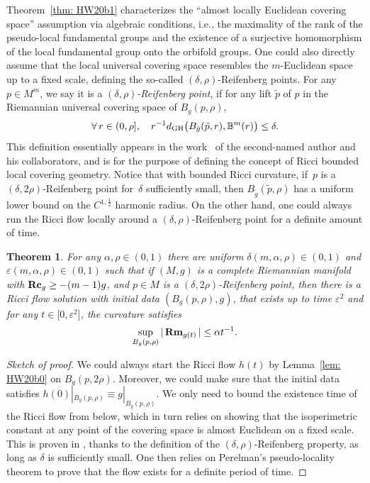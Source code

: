\documentclass[pdftex]{sigma}
\numberwithin{equation}{section}
\newtheorem{Theorem}{Theorem}[section]
\newcommand{\Rm}{\operatorname{\bf Rm}}
\newcommand{\Rc}{\operatorname{\bf Rc}}
\begin{document}
Theorem~\ref{thm: HW20b1} characterizes the ``almost locally Euclidean
covering space'' assumption via algebraic conditions, i.e., the maximality of
the rank of the pseudo-local fundamental groups and the existence of a
surjective homomorphism of the local fundamental group onto the orbifold
groups. One could also directly assume that the local universal covering space
resembles the $m$-Euclidean space up to a fixed scale, defining the so-called
$(\delta,\rho)$-Reifenberg points. For any $p\in M^m$, we say it is a
$(\delta,\rho)$\emph{-Reifenberg point}, if for any lift $\tilde{p}$ of $p$ in
the Riemannian universal covering space of $B_g(p,\rho)$,
\begin{align*}
\forall\, r\in (0,\rho],\quad r^{-1}d_{\rm GH} \big(B_{\tilde{g}}(\tilde{p},r),
\mathbb{B}^m(r) \big) \le \delta.
\end{align*}
This definition essentially appears in the work~\cite{HKRX18} of the
second-named author and his collaborators, and is for the purpose of defining
the concept of Ricci bounded local covering geometry. Notice that with bounded
Ricci curvature, if~$p$ is a~$(\delta,2\rho)$-Reifenberg point for~$\delta$
sufficiently small, then $B_{\tilde{g}}(\tilde{p},\rho)$ has a uniform lower
bound on the $C^{1,\frac{1}{2}}$ harmonic radius. On the other hand, one could
always run the Ricci flow locally around a $(\delta,\rho)$-Reifenberg point for
a definite amount of time.
\begin{Theorem}\label{thm: HKRX18b}
For any $\alpha,\rho \in (0,1)$ there are uniform $\delta(m,\alpha,\rho) \in
(0,1)$ and $\varepsilon(m,\alpha,\rho)\in (0,1)$ such that if $(M,g)$ is a
complete Riemannian manifold with $\Rc_g\ge-(m-1)g$, and $p\in M$ is a
$(\delta,2\rho)$-Reifenberg point, then there is a Ricci flow solution with
initial data $(B_g(p,\rho),g)$, that exists up to time $\varepsilon^2$
and for any $t\in \big[0,\varepsilon^2\big]$, the curvature satisfies
\begin{align*}
\sup_{B_g(p,\rho)} |\Rm_{g(t)} | \le \alpha t^{-1}.
\end{align*}
\end{Theorem}
\begin{proof}[Sketch of proof]
We could always start the Ricci flow $h(t)$ by Lemma~\ref{lem: HW20b0} on
$B_g(p,2\rho)$. Moreover, we could make sure that the initial data satisfies
$h(0)|_{B_g(p,\rho)}\equiv g|_{B_g(p,\rho)}$. We only need to bound the
existence time of the Ricci flow from below, which in turn relies on showing
that the isoperimetric constant at any point of the covering space is almost
Euclidean on a fixed scale. This is proven in \cite{CM17}, thanks to the
definition of the $(\delta,\rho)$-Reifenberg property, as long as $\delta$ is
sufficiently small. One then relies on Perelman's pseudo-locality theorem to
prove that the flow exists for a definite period of time.
\end{proof}
\end{document}
